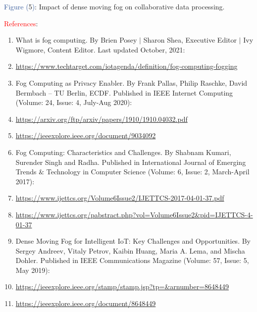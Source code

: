 \documentclass[11pt]{article}
\begin{document}
\begin{center}
\textcolor[HTML]{2F5496}{Figure (}5\textcolor[HTML]{2F5496}{)}: Impact of dense moving fog on collaborative data processing.
\end{center}



\newpage

\vspace{1\baselineskip}
{\Large \textcolor[HTML]{FF0000}{References}:}

\begin{enumerate}
\item \label{item:firstRefernce}What is fog computing. By Brien Posey $\vert$ Sharon Shea, Executive Editor $\vert$ Ivy Wigmore, Content Editor. Last updated October, 2021:
\item[] \url{https://www.techtarget.com/iotagenda/definition/fog-computing-fogging}
\newline

\item \label{item:secondRefernce}Fog Computing as Privacy Enabler. By Frank Pallas, Philip Raschke, David Bermbach – TU Berlin, ECDF. Published in IEEE Internet Computing (Volume: 24, Issue: 4, July-Aug 2020):
\item[] \url{https://arxiv.org/ftp/arxiv/papers/1910/1910.04032.pdf}
\item[] \url{https://ieeexplore.ieee.org/document/9034092}
\newline

\item \label{item:thirdRefernce}Fog Computing: Characteristics and Challenges. By Shabnam Kumari, Surender Singh and Radha. Published in International Journal of Emerging Trends $\&$ Technology in Computer Science (Volume: 6, Issue: 2, March-April 2017):
\item[] \url{https://www.ijettcs.org/Volume6Issue2/IJETTCS-2017-04-01-37.pdf}
\item[] \url{https://www.ijettcs.org/pabstract.php?vol=Volume6Issue2&pid=IJETTCS-4-01-37}
\newline

\item \label{item:fourthRefernce}Dense Moving Fog for Intelligent IoT: Key Challenges and Opportunities. By Sergey Andreev, Vitaly Petrov, Kaibin Huang, Maria A. Lema, and Mischa Dohler. Published in IEEE Communications Magazine (Volume: 57, Issue: 5, May 2019):
\item[] \url{https://ieeexplore.ieee.org/stamp/stamp.jsp?tp=&arnumber=8648449}
\item[] \url{https://ieeexplore.ieee.org/document/8648449}
\end{enumerate}
\end{document}
